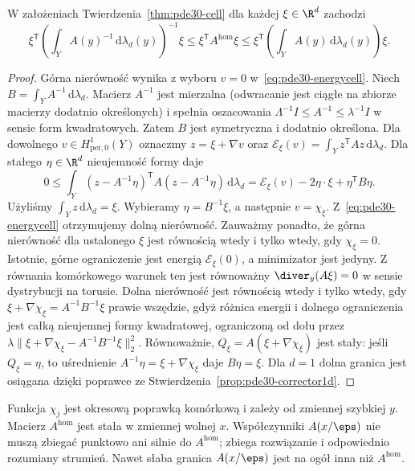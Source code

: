 \begin{wniosek}
\label{cor:pde30-harmonic-arithmetic}
W założeniach Twierdzenia~\ref{thm:pde30-cell}
dla każdej $\xi\in\R^d$ zachodzi
\[
 \xi^{\mathsf T}\left(\int_Y A(y)^{-1}
 \,\mathrm d\lambda_d(y)\right)^{-1}\xi
 \le\xi^{\mathsf T}A^{\mathrm{hom}}\xi
 \le\xi^{\mathsf T}\left(\int_Y A(y)
 \,\mathrm d\lambda_d(y)\right)\xi .
\]
\end{wniosek}
\begin{proof}
Górna nierówność wynika z wyboru $v=0$
w~\eqref{eq:pde30-energycell}.
Niech $B=\int_Y A^{-1}\,\mathrm d\lambda_d$.
Macierz $A^{-1}$ jest mierzalna (odwracanie
jest ciągłe na zbiorze macierzy dodatnio określonych)
i spełnia oszacowania $\Lambda^{-1}I\le A^{-1}\le\lambda^{-1}I$
w sensie form kwadratowych. Zatem $B$ jest
symetryczna i dodatnio określona.
Dla dowolnego $v\in H^1_{\mathrm{per},0}(Y)$
oznaczmy $z=\xi+\nabla v$ oraz
$\mathcal E_\xi(v)=\int_Y z^{\mathsf T}Az\,\mathrm d\lambda_d$.
Dla stałego $\eta\in\R^d$ nieujemność formy daje
\[
 0\le\int_Y (z-A^{-1}\eta)^{\mathsf T}
 A(z-A^{-1}\eta)\,\mathrm d\lambda_d
 =\mathcal E_\xi(v)-2\eta\cdot\xi+\eta^{\mathsf T}B\eta.
\]
Użyliśmy $\int_Y z\,\mathrm d\lambda_d=\xi$.
Wybieramy $\eta=B^{-1}\xi$, a następnie
$v=\chi_\xi$. Z~\eqref{eq:pde30-energycell}
otrzymujemy dolną nierówność.
Zauważmy ponadto, że górna nierówność dla ustalonego
$\xi$ jest równością wtedy i tylko wtedy, gdy
$\chi_\xi=0$. Istotnie, górne ograniczenie jest
energią $\mathcal E_\xi(0)$, a minimizator jest jedyny.
Z równania komórkowego warunek ten jest równoważny
$\diver_y(A\xi)=0$ w sensie dystrybucji na torusie.
Dolna nierówność jest równością wtedy i tylko wtedy,
gdy $\xi+\nabla\chi_\xi=A^{-1}B^{-1}\xi$ prawie
wszędzie, gdyż różnica energii i dolnego ograniczenia
jest całką nieujemnej formy kwadratowej, ograniczoną
od dołu przez
$\lambda\|\xi+\nabla\chi_\xi-A^{-1}B^{-1}\xi\|_2^2$.
Równoważnie, $Q_\xi=A(\xi+\nabla\chi_\xi)$ jest
stały: jeśli $Q_\xi=\eta$, to uśrednienie
$A^{-1}\eta=\xi+\nabla\chi_\xi$ daje $B\eta=\xi$.
Dla $d=1$ dolna granica jest osiągana dzięki
poprawce ze Stwierdzenia~\ref{prop:pde30-corrector1d}.
\end{proof}

\begin{uwaga}
Funkcja $\chi_j$ jest okresową poprawką komórkową i zależy
od zmiennej szybkiej $y$. Macierz $A^{\mathrm{hom}}$ jest stała
w zmiennej wolnej $x$. Współczynniki $A(x/\eps)$ nie muszą
zbiegać punktowo ani silnie do $A^{\mathrm{hom}}$; zbiega
rozwiązanie i odpowiednio rozumiany strumień. Nawet słaba
granica $A(x/\eps)$ jest na ogół inna niż $A^{\mathrm{hom}}$.
\end{uwaga}

